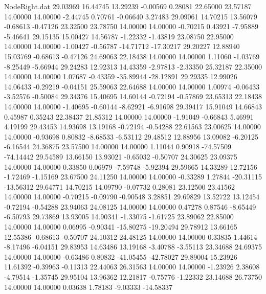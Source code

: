 \begin{filecontents}{NodeRight.dat}
  29.03969   16.44745   13.29239    -0.00569    0.28081   22.65000   23.57187   14.00000   14.00000   -2.44745    0.70761   -0.06640    3.27483
  29.09061   14.70215   13.56079    -0.68613   -0.47126   23.32500   23.78750   14.00000   14.00000   -0.70215    0.43921   -7.95889   -5.46641
  29.15135   15.00427   14.56787    -1.22332   -1.43819   23.08750   22.95000   14.00000   14.00000   -1.00427   -0.56787  -14.71712  -17.30217
  29.20227   12.88940   15.03769    -0.68613   -0.47126   24.69063   22.18438   14.00000   14.00000    1.11060   -1.03769   -8.25449   -5.66944
  29.24283   12.92313   14.43359    -2.97813   -2.33350   25.32187   22.35000   14.00000   14.00000    1.07687   -0.43359  -35.89944  -28.12891
  29.29335   12.99026   14.06433    -0.29219   -0.04151   25.59063   22.64688   14.00000   14.00000    1.00974   -0.06433   -3.52576   -0.50084
  29.34376   15.40695   14.60144    -0.72194   -0.57869   23.65313   22.18438   14.00000   14.00000   -1.40695   -0.60144   -8.62921   -6.91698
  29.39417   15.91049   14.66843     0.45987    0.35243   22.38437   21.85312   14.00000   14.00000   -1.91049   -0.66843    5.46991    4.19199
  29.43453   14.93698   13.19168    -0.72194   -0.54288   22.61563   23.00625   14.00000   14.00000   -0.93698    0.80832   -8.68533   -6.53112
  29.48512   12.88956   13.09082    -6.20125   -6.16544   24.36875   23.57500   14.00000   14.00000    1.11044    0.90918  -74.57509  -74.14442
  29.54589   13.66150   13.93021    -0.65032   -0.50707   24.30625   23.09375   14.00000   14.00000    0.33850    0.06979   -7.59748   -5.92394
  29.59665   14.33289   12.72156    -1.72469   -1.15169   23.67500   24.11250   14.00000   14.00000   -0.33289    1.27844  -20.31115  -13.56312
  29.64771   14.70215   14.09790    -0.07732    0.28081   23.12500   23.41562   14.00000   14.00000   -0.70215   -0.09790   -0.90548    3.28851
  29.69829   13.52722   13.12454    -0.72194   -0.54288   23.94063   24.08125   14.00000   14.00000    0.47278    0.87546   -8.65449   -6.50793
  29.73869   13.93005   14.90341    -1.33075   -1.61725   23.89062   22.85000   14.00000   14.00000    0.06995   -0.90341  -15.80275  -19.20494
  29.78912   13.66165   12.55386    -0.68613   -0.50707   24.10312   24.48125   14.00000   14.00000    0.33835    1.44614   -8.17496   -6.04151
  29.83953   14.63486   13.19168    -3.40788   -3.55113   23.34688   24.69375   14.00000   14.00000   -0.63486    0.80832  -41.05455  -42.78027
  29.89004   15.23926   11.61392    -0.39963   -0.11313   22.44063   26.31563   14.00000   14.00000   -1.23926    2.38608   -4.79514   -1.35745
  29.95104   13.96362   12.21817    -0.75776   -1.22332   23.14688   26.73750   14.00000   14.00000    0.03638    1.78183   -9.03333  -14.58337

\end{filecontents}
